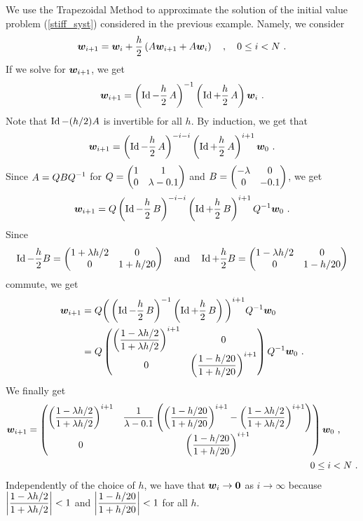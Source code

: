 \begin{egg}
We use the Trapezoidal Method to approximate the solution of
the initial value problem (\ref{stiff_syst}) considered in the previous
example.  Namely, we consider
\[
\bm{w}_{i+1} = \bm{w}_i + \frac{h}{2}\left( A \bm{w}_{i+1}
+ A \bm{w}_i \right) \quad , \quad 0 \leq i < N \ .
\]
If we solve for $\bm{w}_{i+1}$, we get
\[
\bm{w}_{i+1} = \left( \operatorname{Id} -\frac{h}{2}\,A \right)^{-1}
\left( \operatorname{Id} +\frac{h}{2}\,A\right) \bm{w}_i \ .
\]
Note that $\operatorname{Id} - (h/2)A$ is invertible for all $h$.  By
induction, we get that
\[
\bm{w}_{i+1} = \left( \operatorname{Id} -\frac{h}{2}\,A \right)^{-i-i}
\left( \operatorname{Id} +\frac{h}{2}\,A\right)^{i+1} \bm{w}_0 \ .
\]
Since $\displaystyle A = Q B Q^{-1}$ for
$\displaystyle Q=\begin{pmatrix} 1 & 1 \\
0 & \lambda -0.1 \end{pmatrix}$ and
$\displaystyle B=\begin{pmatrix} -\lambda & 0 \\
0 & -0.1 \end{pmatrix}$, we get
\[
\bm{w}_{i+1} = Q\left( \operatorname{Id} -\frac{h}{2}\,B \right)^{-i-i}
\left( \operatorname{Id} +\frac{h}{2}\,B\right)^{i+1}Q^{-1} \bm{w}_0 \ .
\]
Since
\[
\operatorname{Id} - \frac{h}{2} B =
\begin{pmatrix}
1 + \lambda h/2 & 0 \\
0 & 1 + h/20  
\end{pmatrix}
\quad \text{and} \quad
\operatorname{Id} + \frac{h}{2} B =
\begin{pmatrix}
1 - \lambda h/2 & 0 \\
0 & 1 - h/20  
\end{pmatrix}
\]
commute, we get
\begin{align*}
\bm{w}_{i+1} &= Q \bigg( \left( \operatorname{Id} -\frac{h}{2}\,B \right)^{-1}
\left( \operatorname{Id} +\frac{h}{2}\,B\right)\bigg)^{i+1}Q^{-1} \bm{w}_0 \\
&= Q
\begin{pmatrix}
\left(\displaystyle \frac{1-\lambda h/2}{1+\lambda h/2}\right)^{i+1}
& 0 \\
0 &                                                                     
\left(\displaystyle \frac{1- h/20}{1+ h/20}\right)^{i+1}
\end{pmatrix}
Q^{-1} \bm{w}_0 \ .
\end{align*}
We finally get
\begin{align*}
\VEC{w}_{i+1} &=
\begin{pmatrix}
\left(\DS \frac{1-\lambda h/2}{1+\lambda h/2}\right)^{i+1}
& \DS
\frac{1}{\lambda - 0.1} \left( \left(\frac{1- h/20}{1+ h/20}\right)^{i+1}
- \left(\frac{1-\lambda h/2}{1+\lambda h/2}\right)^{i+1}\right)
\\
0 & \left(\DS \frac{1- h/20}{1+ h/20}\right)^{i+1}
\end{pmatrix} \VEC{w}_0 \ , \\
&\hspace{30em} 0 \leq i < N \ .
\end{align*}
Independently of the choice of $h$, we have that
$\bm{w}_i \rightarrow \bm{0}$ as $i \rightarrow \infty$ because
$\displaystyle \bigg| \frac{1-\lambda h/2}{1+\lambda h/2} \bigg| < 1$
and
$\displaystyle \bigg| \frac{1-h/20}{1+h/20} \bigg| < 1$
for all $h$.


\end{egg}
